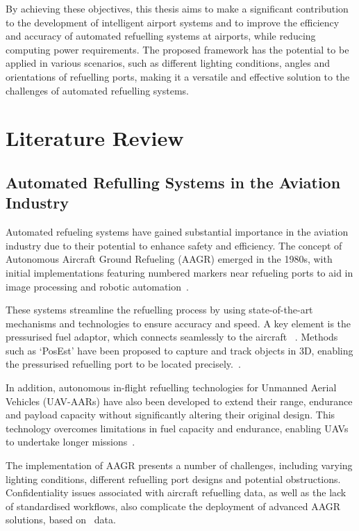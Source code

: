 \documentclass[12pt,oneside]{book} %
\begin{document}
By achieving these objectives, this thesis aims to make a significant
contribution to the development of intelligent airport systems and to improve
the efficiency and accuracy of automated refuelling systems at airports, while
reducing computing power requirements. The proposed framework has the potential
to be applied in various scenarios, such as different lighting conditions,
angles and orientations of refuelling ports, making it a versatile and
effective solution to the challenges of automated refuelling systems.

\chapter{Literature Review}
\section{Automated Refulling Systems in the Aviation Industry}
Automated refueling systems have gained substantial importance in the aviation
industry due to their potential to enhance safety and efficiency. The concept
of Autonomous Aircraft Ground Refueling (AAGR) emerged in the 1980s, with
initial implementations featuring numbered markers near refueling ports to aid
in image processing and robotic automation~\cite{Schultz1986, Bennett1991,
    DatasetAGR}.

These systems streamline the refuelling process by using state-of-the-art
mechanisms and technologies to ensure accuracy and speed. A key element is the
pressurised fuel adaptor, which connects seamlessly to the aircraft
~\cite{HybridDatasetAGRV2}. Methods such as `PosEst' have been proposed to
capture and track objects in 3D, enabling the pressurised refuelling port to be
located precisely.~\cite{AGRPoseEstimation}.

In addition, autonomous in-flight refuelling technologies for Unmanned Aerial
Vehicles (UAV-AARs) have also been developed to extend their range, endurance
and payload capacity without significantly altering their original design. This
technology overcomes limitations in fuel capacity and endurance, enabling UAVs
to undertake longer missions~\cite{AARBinocularVision}.

The implementation of AAGR presents a number of challenges, including varying
lighting conditions, different refuelling port designs and potential
obstructions. Confidentiality issues associated with aircraft refuelling data,
as well as the lack of standardised workflows, also complicate the deployment
of advanced AAGR solutions, based on~\cite{DatasetAGR} data.
\end{document}
